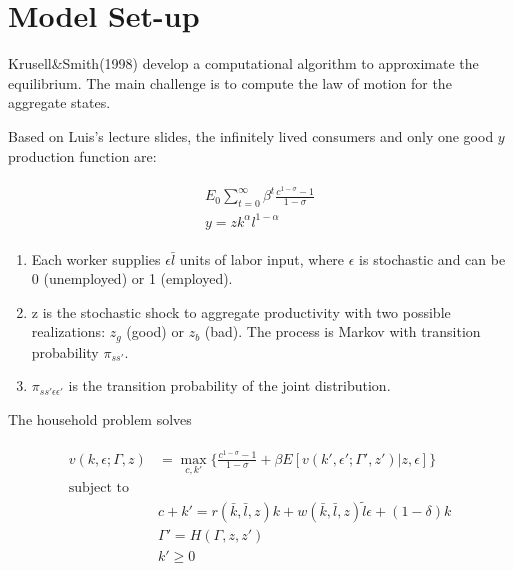 
% 



\section{Model Set-up}

Krusell\&Smith(1998) develop a computational algorithm to approximate the equilibrium. The main challenge is to compute the law of motion for the aggregate states.

Based on Luis's lecture slides, the infinitely lived consumers and only one good $y$ production function are:

\begin{align}
\begin{split}
E_0 \sum_{t=0}^{\infty} \beta^t \frac{c^{1-\sigma} - 1}{1 - \sigma} \\
y = z k^{\alpha}l^{1-\alpha}
\end{split}
\end{align}



\begin{enumerate}
\item Each worker supplies $\epsilon \bar{l}$ units of labor input, where $\epsilon$ is stochastic and can be 0 (unemployed) or 1 (employed). 

\item z is the stochastic shock to aggregate productivity with two possible realizations: $z_g$ (good) or $z_b$ (bad). The process is Markov with transition probability $\pi_{ss'}$.

\item $\pi_{ss' \epsilon \epsilon'}$ is the transition probability of the joint distribution.
\end{enumerate}

The household problem solves

\begin{align} \label{hhproblem}
\begin{split}
v(k,\epsilon; \Gamma ,z) &= \max_{c,k'} \{ \frac{c^{1-\sigma} - 1}{1 - \sigma} + \beta E [v(k',\epsilon'; \Gamma' ,z')| z, \epsilon]\} \\
\text{subject to} \\
& c + k' = r(\bar{k},\bar{l},z)k + w(\bar{k},\bar{l},z)\tilde{l}\epsilon + (1-\delta)k \\
& \Gamma' = H(\Gamma,z,z') \\
& k' \geq 0
\end{split}
\end{align}


